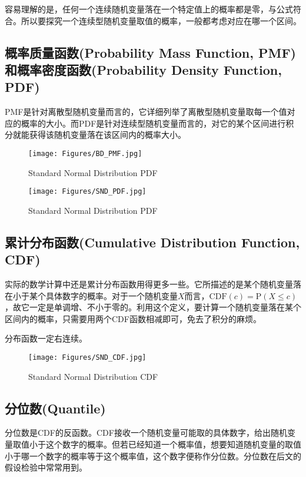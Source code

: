 \documentclass[UTF8]{ctexbook}
\begin{document}
容易理解的是，任何一个连续随机变量落在一个特定值上的概率都是零，与公式符合。所以要探究一个连续型随机变量取值的概率，一般都考虑对应在哪一个区间。
\subsection{概率质量函数(Probability Mass Function, PMF)和概率密度函数(Probability Density Function, PDF)}
\label{pmf-pdf}
PMF是针对离散型随机变量而言的，它详细列举了离散型随机变量取每一个值对应的概率的大小。而PDF是针对连续型随机变量而言的，对它的某个区间进行积分就能获得该随机变量落在该区间内的概率大小。
\begin{figure}[ht]
	\begin{minipage}{0.45\textwidth}
		\centering
		\texttt{[image: Figures/BD\_PMF.jpg]}
		\caption{Standard Normal Distribution PDF}
	\label{fig:Bin_PMF}
	\end{minipage}
	\begin{minipage}{0.45\textwidth}
		\centering
		\texttt{[image: Figures/SND\_PDF.jpg]}
		\caption{Standard Normal Distribution PDF}
	\end{minipage}
\end{figure}
\subsection{累计分布函数(Cumulative Distribution Function, CDF)}
\label{cdf}
实际的数学计算中还是累计分布函数用得更多一些。它所描述的是某个随机变量落在小于某个具体数字的概率。对于一个随机变量$X$而言，$\mathrm{CDF}(c)=\mathrm{P}(X\leq c)$，故它一定是单调增、不小于零的。利用这个定义，要计算一个随机变量落在某个区间内的概率，只需要用两个CDF函数相减即可，免去了积分的麻烦。

分布函数一定右连续。

\newpage %
\begin{figure}[ht]
	\centering
	\texttt{[image: Figures/SND\_CDF.jpg]}
	\caption{Standard Normal Distribution CDF}
	\label{fig:StNor_CDF}
\end{figure}

\subsection{分位数(Quantile)}
分位数是CDF的反函数。CDF接收一个随机变量可能取的具体数字，给出随机变量取值小于这个数字的概率。但若已经知道一个概率值，想要知道随机变量的取值小于哪一个数字的概率等于这个概率值，这个数字便称作分位数。分位数在后文的假设检验中常常用到。
\end{document}
